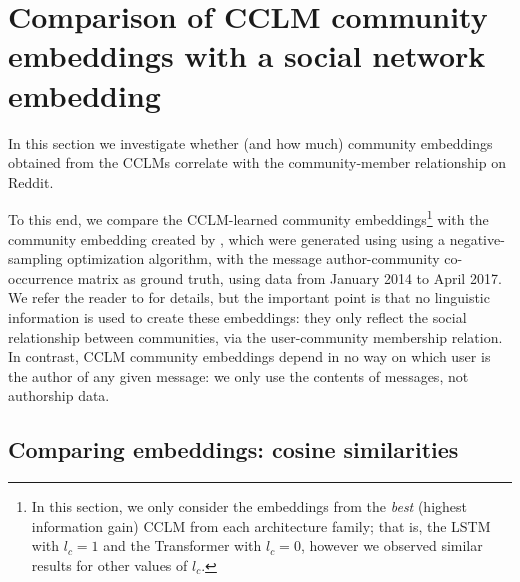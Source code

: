 \documentclass[11pt]{article}
\begin{document}
\section{Comparison of CCLM community embeddings with a social network embedding}\label{sec:embedding-analysis}

In this section we investigate whether (and how much) community
embeddings obtained from the CCLMs correlate with the community-member
relationship on Reddit.

To this end, we compare the CCLM-learned community
embeddings\footnote{
  In this section, we only consider the embeddings from 
  the \emph{best} (highest information gain) CCLM from each architecture family; 
  that is, the LSTM with $l_c=1$ and the Transformer with $l_c=0$, however we
  observed similar results for other values of $l_c$.}
with the community embedding created by \citet{Kumar2018},
which were generated using using a negative-sampling optimization
algorithm, with the message author-community co-occurrence matrix as ground
truth, using data from January 2014 to April 2017.
We refer the reader
to \citet{Kumar2018}
for details, but the important point is that no linguistic
information is used to create these embeddings: they only reflect the social
relationship between communities, via 
the user-community membership relation. In contrast, CCLM community embeddings depend in no
way on which user is the author of any given message: we only use the
contents of messages, not authorship data.
%

\subsection{Comparing embeddings: cosine similarities}
\label{sec:storytelling}

\newcommand{\pairwisecossimbarplot}[1]{
    \nextgroupplot[ybar=0pt,
      bar width=0.25cm,
      xticklabels from table={floats/#1}{comms-label},
      enlargelimits=0.15,
      yticklabels={,,}
    ]
    \addplot[draw=violet,fill=violet!10] table [y=lstm-sim] {floats/#1};
    \addplot[draw=teal,fill=teal!10] table [y=transformer-sim] {floats/#1};
    \addplot[draw=red,fill=red!10] table [y=social-sim] {floats/#1};
}
\end{document}
